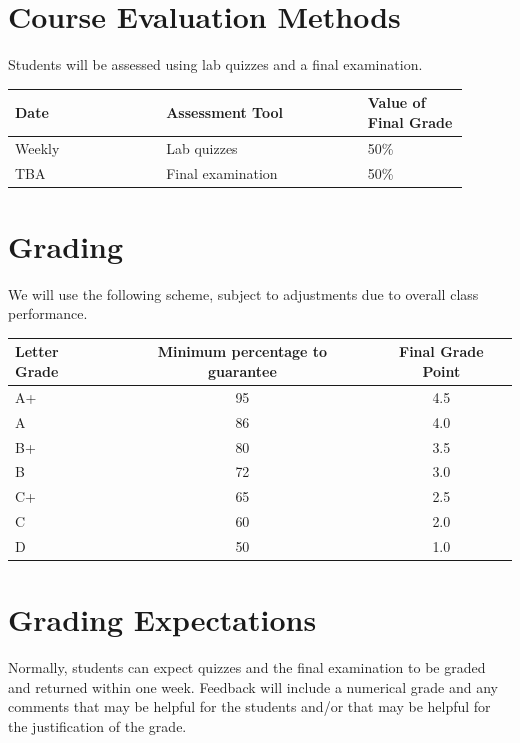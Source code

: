 \documentclass[12pt]{article}
\begin{document}
\section{Course Evaluation Methods}

Students will be assessed using lab quizzes and a final examination.

\begin{center}
\begin{tabular}[t]{p{0.3\linewidth}p{0.4\linewidth}p{0.2\linewidth}}
\toprule
\mbox{}\newline \textbf{Date} &	\mbox{}\newline\textbf{Assessment Tool}	& \textbf{Value of \newline Final Grade} \\
\midrule
Weekly & Lab quizzes & 50\% \\
TBA & Final examination & 50\% \\
\bottomrule
\end{tabular}
\end{center}

\section{Grading}

We will use the following scheme, subject to adjustments due to overall class performance.

\begin{center}
\begin{tabular}[t]{lcc}
\toprule
Letter Grade & Minimum percentage to guarantee & Final Grade Point  \\
\midrule
A+ & 95 & 4.5 \\
A & 86 & 4.0 \\
B+ & 80 & 3.5 \\
B & 72 &  3.0 \\
C+ & 65  & 2.5 \\
C & 60 & 2.0 \\
D & 50 & 1.0  \\
\bottomrule
\end{tabular}
\end{center}

\section{Grading Expectations}

Normally, students can expect quizzes and the final examination to be graded and returned within one week. Feedback will include a numerical grade and any comments that may be helpful for the students and/or that may be helpful for the justification of the grade.
\end{document}

